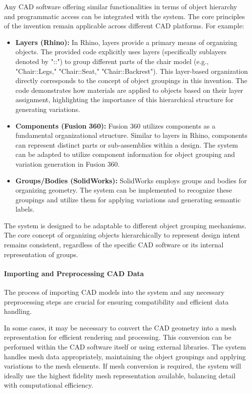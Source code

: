 \documentclass{article}
\begin{document}
Any CAD software offering similar functionalities in terms of object hierarchy and programmatic access can be integrated with the system. The core principles of the invention remain applicable across different CAD platforms. For example:


\begin{itemize}
    \item \textbf{Layers (Rhino):} In Rhino, layers provide a primary means of organizing objects. The provided code explicitly uses layers (specifically sublayers denoted by "::") to group different parts of the chair model (e.g., "Chair::Legs," "Chair::Seat," "Chair::Backrest"). This layer-based organization directly corresponds to the concept of object groupings in this invention. The code demonstrates how materials are applied to objects based on their layer assignment, highlighting the importance of this hierarchical structure for generating variations.
    \item \textbf{Components (Fusion 360):} Fusion 360 utilizes components as a fundamental organizational structure. Similar to layers in Rhino, components can represent distinct parts or sub-assemblies within a design. The system can be adapted to utilize component information for object grouping and variation generation in Fusion 360.
    \item \textbf{Groups/Bodies (SolidWorks):} SolidWorks employs groups and bodies for organizing geometry. The system can be implemented to recognize these groupings and utilize them for applying variations and generating semantic labels.
\end{itemize}

The system is designed to be adaptable to different object grouping mechanisms. The core concept of organizing objects hierarchically to represent design intent remains consistent, regardless of the specific CAD software or its internal representation of groups.

\paragraph{Importing and Preprocessing CAD Data}
The process of importing CAD models into the system and any necessary preprocessing steps are crucial for ensuring compatibility and efficient data handling.

In some cases, it may be necessary to convert the CAD geometry into a mesh representation for efficient rendering and processing. This conversion can be performed within the CAD software itself or using external libraries. The system handles mesh data appropriately, maintaining the object groupings and applying variations to the mesh elements. If mesh conversion is required, the system will ideally use the highest fidelity mesh representation available, balancing detail with computational efficiency.
\end{document}
